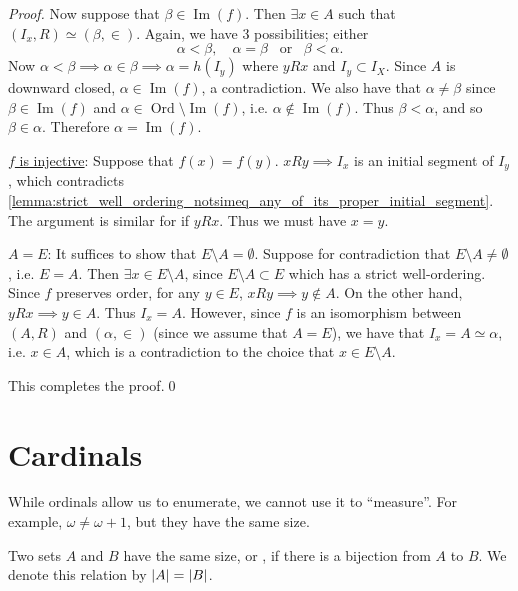 \documentclass[notoc,notitlepage]{tufte-book}
\DeclareMathOperator{\Ord}{Ord }
\DeclareMathOperator{\Img}{Im }
\begin{document}
\begin{proof}
  Now suppose that $\beta \in \Img(f)$. Then $\exists x \in A$ such that $(I_x, R) \simeq (\beta, \in)$. Again, we have 3 possibilities; either
  \begin{equation*}
    \alpha < \beta, \quad \alpha = \beta \enspace \text{ or } \enspace \beta < \alpha.
  \end{equation*}
  Now $\alpha < \beta \implies \alpha \in \beta \implies \alpha = h(I_y)$ where $yRx$ and $I_y \subset I_X$. Since $A$ is downward closed, $\alpha \in \Img(f)$, a contradiction. We also have that $\alpha \neq \beta$ since $\beta \in \Img(f)$ and $\alpha \in \Ord \setminus \Img(f)$, i.e. $\alpha \notin \Img(f)$. Thus $\beta < \alpha$, and so $\beta \in \alpha$. Therefore $\alpha = \Img(f)$.

  \underline{$f$ is injective}: Suppose that $f(x) = f(y)$. $xRy \implies I_x$ is an initial segment of $I_y$, which contradicts \cref{lemma:strict_well_ordering_notsimeq_any_of_its_proper_initial_segment}. The argument is similar for if $yRx$. Thus we must have $x = y$.

  \underline{$A = E$}: It suffices to show that $E \setminus A = \emptyset$. Suppose for contradiction that $E \setminus A \neq \emptyset$, i.e. $E = A$. Then $\exists x \in E \setminus A$, since $E \setminus A \subset E$ which has a strict well-ordering. Since $f$ preserves order, for any $y \in E$, $xRy \implies y \notin A$. On the other hand, $yRx \implies y \in A$. Thus $I_x = A$. However, since $f$ is an isomorphism between $(A, R)$ and $(\alpha, \in)$ (since we assume that $A = E$), we have that $I_x = A \simeq \alpha$, i.e. $x \in A$, which is a contradiction to the choice that $x \in E \setminus A$.

  This completes the proof.\qed
\end{proof}



\section{Cardinals}%
\label{sec:cardinals}

While ordinals allow us to enumerate, we cannot use it to ``measure''. For example, $\omega \neq \omega + 1$, but they have the same size.

\begin{defn}[Equinumerous]
\label{defn:equinumerous}
  Two sets $A$ and $B$ have the same size, or , if there is a bijection from $A$ to $B$. We denote this relation by $\left|A\right| = \left|B\right|$.
\end{defn}
\end{document}
